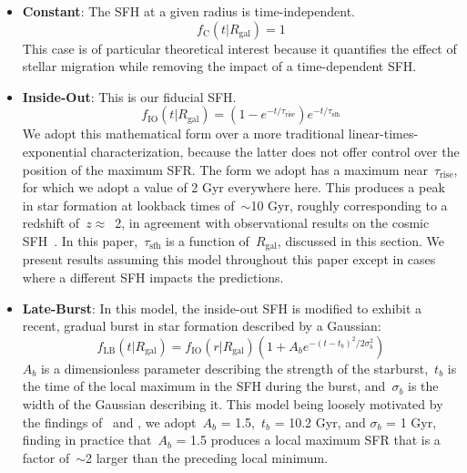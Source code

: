 \documentclass[fleqn, usenatbib]{mnras}
\begin{document}
\begin{itemize} 
	\item \textbf{Constant}: The SFH at a given radius is time-independent. 
	\begin{equation} 
	f_\text{C}(t|R_\text{gal}) = 1 
	\label{eq:constant_sfh} 
	\end{equation} 
	This case is of particular theoretical interest because it quantifies the 
	effect of stellar migration while removing the impact of a time-dependent 
	SFH. 

	\item \textbf{Inside-Out}: This is our fiducial SFH. 
	\begin{equation} 
	f_\text{IO}(t|R_\text{gal}) = (1 - e^{-t / \tau_\text{rise}}) 
	e^{-t / \tau_\text{sfh}} 
	\label{eq:insideout_sfh} 
	\end{equation} 
	We adopt this mathematical form over a more traditional 
	linear-times-exponential characterization, because the latter does not 
	offer control over the position of the maximum SFR. The form we adopt has 
	a maximum near~$\tau_\text{rise}$, for which we adopt a value of 2 Gyr 
	everywhere here. This produces a peak in star formation at lookback times 
	of~$\sim$10 Gyr, roughly corresponding to a redshift of~$z \approx$~2, in 
	agreement with observational results on the cosmic SFH~\citep{Madau2014}. 
	In this paper,~$\tau_\text{sfh}$ is a function of~$R_\text{gal}$, discussed 
	in this section. We present results assuming this model throughout this 
	paper except in cases where a different SFH impacts the predictions. 

	\item \textbf{Late-Burst}: In this model, the inside-out SFH is modified to 
	exhibit a recent, gradual burst in star formation described by a Gaussian: 
	\begin{equation} 
	f_\text{LB}(t|R_\text{gal}) = f_\text{IO}(r|R_\text{gal}) 
	(1 + A_be^{-(t - t_b)^2/2\sigma_b^2}) 
	\label{eq:lateburst_sfh} 
	\end{equation} 
	$A_b$ is a dimensionless parameter describing the strength of the 
	starburst,~$t_b$ is the time of the local maximum in the SFH during the 
	burst, and~$\sigma_b$ is the width of the Gaussian describing it. This 
	model being loosely motivated by the findings of~\citet{Mor2019} and 
	\citet{Isern2019}, we adopt~$A_b$ = 1.5,~$t_b$ = 10.2 Gyr, and 
	$\sigma_b$ = 1 Gyr, finding in practice that~$A_b$ = 1.5 produces a 
	local maximum SFR that is a factor of~$\sim$2 larger than the preceding 
	local minimum. 


\end{itemize}
\end{document}
